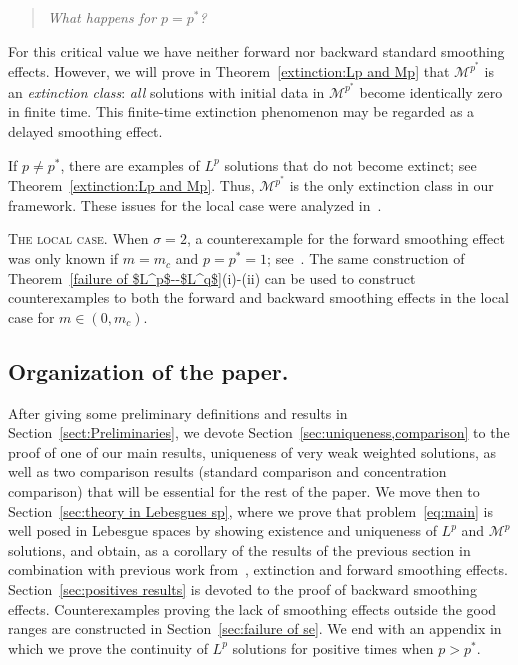 \documentclass[leqno,12pt]{amsart}
\theoremstyle{definition}
\theoremstyle{remark}
\numberwithin{equation}{section}
\begin{document}
\begin{quote}
    \centering
    \emph{What happens for $p=p^*$?}  
\end{quote}

For this critical value we have neither forward nor backward standard smoothing effects. However, we will prove in Theorem~\ref{extinction:Lp and Mp} that $\mathcal{M}^{p^*}$ is an \emph{extinction class}: \emph{all} solutions with initial data in $\mathcal{M}^{p^*}$ become identically zero in finite time. This finite-time extinction phenomenon may be regarded as a delayed smoothing effect.  

If $p\neq p^*$, there are examples of $L^{p}$ solutions that do not become extinct; see Theorem~\ref{extinction:Lp and Mp}. Thus, $\mathcal{M}^{p^*}$ is the only extinction class in our framework. These issues for the local case were analyzed in~\cite{smoothbook}.


\noindent\textsc{The local case. }  When $\sigma=2$, a counterexample for the forward smoothing effect was only known if $m=m_c$ and $p=p^*=1$; see~\cite{chasvaz}. The same construction of Theorem~\ref{failure of $L^p$--$L^q$}(i)-(ii) can be used to construct counterexamples to both the forward and backward smoothing effects in the local case for $m\in(0,m_c)$.

\subsection*{Organization of the paper.} After giving some preliminary definitions and results in Section~\ref{sect:Preliminaries}, we devote Section~\ref{sec:uniqueness,comparison} to the proof of one of our main results, uniqueness of very weak weighted solutions, as well as two comparison results (standard comparison and concentration comparison) that will be essential for the rest of the paper. We move then to  Section~\ref{sec:theory in Lebesgues sp}, where we prove that problem~\eqref{eq:main} is well posed in Lebesgue spaces by showing existence and uniqueness of $L^p$ and $\mathcal{M}^p$ solutions, and obtain, as a corollary of the results of the previous section in combination with previous work from~\cite{vazquez:Mp_SE}, extinction and forward smoothing effects. Section~\ref{sec:positives results} is devoted to the proof of backward smoothing effects. Counterexamples proving the lack of smoothing effects outside the good ranges are constructed in Section~\ref{sec:failure of se}. We end with an appendix in which we prove the continuity of $L^p$ solutions for positive times when $p>p^*$.
\end{document}
